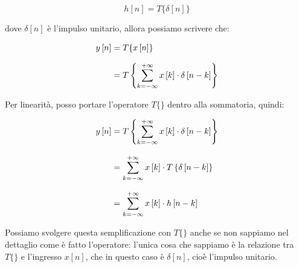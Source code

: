 {
    \Large 
    \begin{equation}
        h \left[ n \right] 
        = 
        T \{ \delta \left[ n \right] \}
    \end{equation}
}

dove $\delta \left[ n \right]$ è l'impulso unitario, 
allora possiamo scrivere che: 

{
    \Large 
    \begin{equation}
        \setlength{\jot}{10pt} %
        \begin{split}
            y \left[ n\right]
            &= 
            T \{ x \left[ n\right]\}
            \\
            &= 
            T 
            \left\{ 
                \sum_{k = - \infty}^{+ \infty}
                x \left[ k\right]
                \cdot 
                \delta \left[ n - k\right]
            \right\}
        \end{split}
    \end{equation}
}

Per linearità, 
posso portare l'operatore $T \{ \}$ dentro alla sommatoria, quindi: 

{
    \Large 
    \begin{equation}
        \setlength{\jot}{10pt} %
        \begin{split}
            y \left[ n\right]
            &= 
            T 
            \left\{ 
                \sum_{k = - \infty}^{+ \infty}
                x \left[ k\right]
                \cdot 
                \delta \left[ n - k\right]
            \right\}
            \\
            &=    
            \sum_{k = - \infty}^{+ \infty}
                x \left[ k\right]
                \cdot
                T 
            \left\{  
                \delta \left[ n - k\right]
            \right\}
            \\
            &= 
            \sum_{k = - \infty}^{+ \infty}
            x \left[ k\right]
            \cdot 
            h \left[ n - k \right]
        \end{split}
    \end{equation}
}

\begin{tcolorbox}

Possiamo svolgere questa semplificazione con $T \{ \}$ anche se non sappiamo nel dettaglio come è fatto l'operatore: 
l'unica cosa che sappiamo è la relazione tra $T \{ \}$ e l'ingresso $x \left[ n\right]$, 
che in questo caso è $\delta \left[ n\right]$, cioè l'impulso unitario.
    
\end{tcolorbox}

